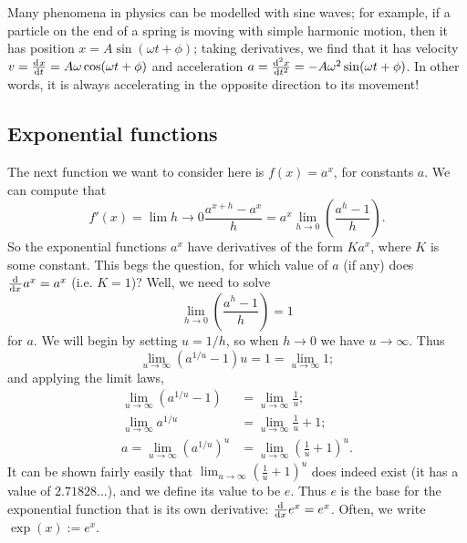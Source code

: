 \begin{app}
  Many phenomena in physics can be modelled with sine waves; for example, if a particle on the end of a spring
  is moving with simple harmonic motion, then it has position $ x = A \sin (\omega t + \phi) $; taking derivatives,
  we find that it has velocity $ v = \od{x}{t} = A\omega \cos (\omega t + \phi) $ and acceleration $ a = \od[2]{x}{t} = -A \omega^2 \sin (\omega t + \phi) $.
  In other words, it is always accelerating in the opposite direction to its movement!
\end{app}

\subsection{Exponential functions}
The next function we want to consider here is $ f(x) = a^x $, for constants $ a $. We can
compute that
\begin{displaymath}
  f'(x) = \lim{h \to 0} \frac{a^{x + h} - a^x}{h} =  a^x \lim_{h \to 0} \left( \frac{a^h - 1}{h} \right).
\end{displaymath}
So the exponential functions $ a^x $ have derivatives of the form $ Ka^x $, where $ K $ is some constant. This
begs the question, for which value of $ a $ (if any) does $ \od{}{x} a^x = a^x $ (i.e. $ K = 1 $)? Well, we
need to solve
\begin{displaymath}
  \lim_{h \to 0} \left( \frac{a^h - 1}{h} \right) = 1
\end{displaymath}
for $ a $. We will begin by setting $ u = 1/h $, so when $ h \to 0 $ we have $ u \to \infty $. Thus
\begin{displaymath}
  \lim_{u \to \infty} (a^{1/u} - 1)u = 1 = \lim_{u \to \infty} 1;
\end{displaymath}
and applying the limit laws,
\begin{align*}
  \lim_{u \to \infty} (a^{1/u} - 1) &= \lim_{u \to \infty} \frac{1}{u};\\
  \lim_{u \to \infty} a^{1/u} &= \lim_{u \to \infty} \frac{1}{u} + 1;\\
  a = \lim_{u \to \infty} (a^{1/u})^u &= \lim_{u \to \infty} \left(\frac{1}{u} + 1\right)^u.
\end{align*}
It can be shown fairly easily that $ \lim_{u \to \infty} \left(\frac{1}{u} + 1\right)^u $ does
indeed exist (it has a value of $ 2.71828... $), and we define its value to be $ e $. Thus $ e $
is the base for the exponential function that is its own derivative: $ \od{}{x} e^x = e^x $. Often,
we write $ \exp(x) := e^x $.

